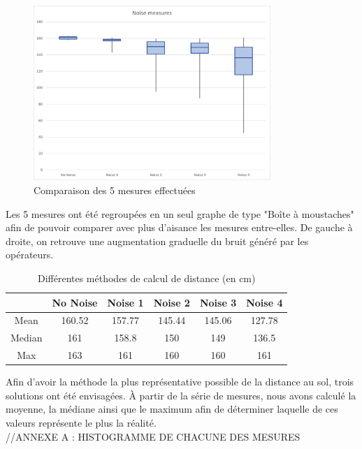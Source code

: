 \begin{figure}[H]
    \centering
    \includegraphics[width=0.8\textwidth]{Images/LiDAR/LiDAR_ErrorMes_Moustache.png}
    \caption{Comparaison des 5 mesures effectuées}
    \label{ErrorMesMoustache}
\end{figure}

Les 5 mesures ont été regroupées en un seul graphe de type "Boîte à moustaches" afin de pouvoir
comparer avec plus d'aisance les mesures entre-elles. De gauche à droite, on retrouve une augmentation
graduelle du bruit généré par les opérateurs.

\begin{table}[H]
    \centering
    \begin{tabular}{|c|c|c|c|c|c|}
        \hline
        & No Noise & Noise 1 & Noise 2 & Noise 3 & Noise 4 \\
        \hline\hline
        Mean & 160.52 & 157.77 & 145.44 & 145.06 & 127.78 \\
        \hline
        Median & 161 & 158.8 & 150 & 149 & 136.5 \\
        \hline
        Max & 163 & 161 & 160 & 160 & 161 \\
        \hline
        
    \end{tabular}
    \caption{Différentes méthodes de calcul de distance (en cm)}
    \label{ComputingMethods}
\end{table}

Afin d'avoir la méthode la plus représentative possible de la distance au sol, trois solutions 
ont été envisagées. À partir de la série de mesures, nous avons calculé la moyenne, la médiane
ainsi que le maximum afin de déterminer laquelle de ces valeurs représente le plus la réalité.\\
//ANNEXE A : HISTOGRAMME DE CHACUNE DES MESURES

